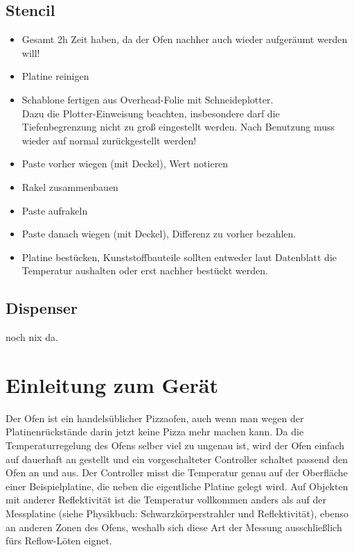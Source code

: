 \documentclass{\basedir/fablab-document}
\begin{document}
\subsection{Stencil}
\begin{itemize}
\item Gesamt 2h Zeit haben, da der Ofen nachher auch wieder aufgeräumt werden will!
\item Platine reinigen
\item Schablone fertigen aus Overhead-Folie mit Schneideplotter. \\ Dazu die Plotter-Einweisung beachten, insbesondere darf die Tiefenbegrenzung nicht zu groß eingestellt werden. Nach Benutzung muss wieder auf normal zurückgestellt werden!
\item Paste vorher wiegen (mit Deckel), Wert notieren
\item Rakel zusammenbauen
\item Paste aufrakeln
\item Paste danach wiegen (mit Deckel), Differenz zu vorher bezahlen.
\item Platine bestücken, Kunststoffbauteile sollten entweder laut Datenblatt die Temperatur aushalten oder erst nachher bestückt werden.
\end{itemize}

\subsection{Dispenser}
noch nix da. 


\section{Einleitung zum Gerät}
Der Ofen ist ein handelsüblicher Pizzaofen, auch wenn man wegen der Platinenrückstände darin jetzt keine Pizza mehr machen kann. Da die Temperaturregelung des Ofens selber viel zu ungenau ist, wird der Ofen einfach auf dauerhaft an gestellt und ein vorgeschalteter Controller schaltet passend den Ofen an und aus. Der Controller misst die Temperatur genau auf der Oberfläche einer Beispielplatine, die neben die eigentliche Platine gelegt wird. Auf Objekten mit anderer Reflektivität ist die Temperatur vollkommen anders als auf der Messplatine (siehe Physikbuch: Schwarzkörperstrahler und Reflektivität), ebenso an anderen Zonen des Ofens, weshalb sich diese Art der Messung ausschließlich fürs Reflow-Löten eignet.

\end{document}
